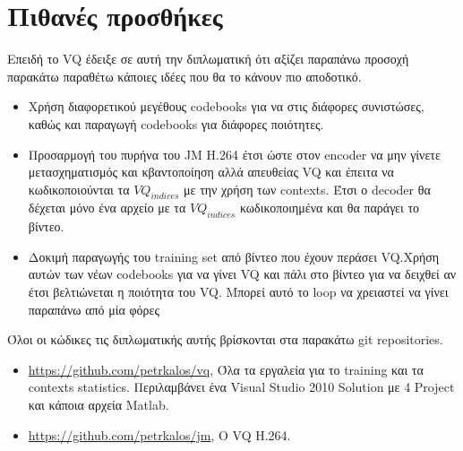 \section{Πιθανές προσθήκες}
\label{section:sect63}

\indent Επειδή το VQ έδειξε σε αυτή την διπλωματική ότι αξίζει παραπάνω προσοχή παρακάτω παραθέτω κάποιες ιδέες που θα το κάνουν πιο αποδοτικό.

\begin{itemize}

    \item Χρήση διαφορετικού μεγέθους codebooks για να στις διάφορες συνιστώσες, καθώς και παραγωγή codebooks για διάφορες ποιότητες.

    \item Προσαρμογή του πυρήνα του JM H.264 έτσι ώστε στον encoder να μην γίνετε μετασχηματισμός και κβαντοποίηση αλλά απευθείας VQ και έπειτα να κωδικοποιούνται τα $VQ_{indices}$ με την χρήση των contexts. Έτσι ο decoder θα δέχεται μόνο ένα αρχείο με τα $VQ_{indices}$ κωδικοποιημένα και θα παράγει το βίντεο.

    \item Δοκιμή παραγωγής του training set από βίντεο που έχουν περάσει VQ.Χρήση αυτών των νέων codebooks για να γίνει VQ και πάλι στο βίντεο για να δειχθεί αν έτσι βελτιώνεται η ποιότητα του VQ. Μπορεί αυτό το loop να χρειαστεί να γίνει παραπάνω από μία φόρες
\end{itemize}

\indent Όλοι οι κώδικες τις διπλωματικής αυτής βρίσκονται στα παρακάτω git repositories.
\begin{itemize}
    \item \url{https://github.com/petrkalos/vq}, Όλα τα εργαλεία για το training και τα contexts statistics. Περιλαμβάνει ένα Visual Studio 2010 Solution με 4 Project και κάποια αρχεία Matlab.

    \item \url{https://github.com/petrkalos/jm}, Ο VQ H.264.
\end{itemize}